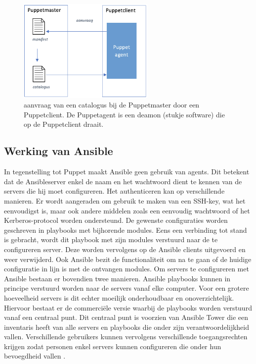 \begin{figure}  \begin{center}
  \includegraphics[width=250px]{img/aanvraagCatalogus.png}
 \end{center}\caption{aanvraag van een catalogus bij de Puppetmaster door een Puppetclient. De Puppetagent is een deamon (stukje software) die op de Puppetclient draait.}  
  \label{fig:aanvraagCatalogus}
\end{figure}


\subsection{Werking van Ansible}

In tegenstelling tot Puppet maakt Ansible geen gebruik van agents. Dit betekent dat de Ansibleserver enkel de naam en het wachtwoord dient te kennen van de servers die hij moet configureren. Het authenticeren kan op verschillende manieren. Er wordt aangeraden om gebruik te maken van een SSH-key, wat het eenvoudigst is, maar ook andere middelen zoals een eenvoudig wachtwoord of het Kerberos-protocol worden ondersteund. De gewenste configuraties worden geschreven in playbooks met bijhorende modules. Eens een verbinding tot stand is gebracht, wordt dit playbook met zijn modules verstuurd naar de te configureren server. Deze worden vervolgens op de Ansible clients uitgevoerd  en weer verwijderd. Ook Ansible bezit de functionaliteit om na te gaan of de huidige configuratie in lijn is met de ontvangen modules. Om servers te configureren met Ansible bestaan er bovendien twee manieren. Ansible playbooks kunnen in principe verstuurd worden naar de servers vanaf elke computer. Voor een grotere hoeveelheid servers is dit echter moeilijk onderhoudbaar en onoverzichtelijk. Hiervoor bestaat er de commerci\"ele versie waarbij de playbooks worden verstuurd vanaf een centraal punt. Dit centraal punt is voorzien van Ansible Tower die een inventaris heeft van alle servers en playbooks die onder zijn verantwoordelijkheid vallen. Verschillende gebruikers kunnen vervolgens verschillende toegangsrechten krijgen zodat personen enkel servers kunnen configureren die onder hun bevoegdheid vallen \autocite{ansibledoc}.

